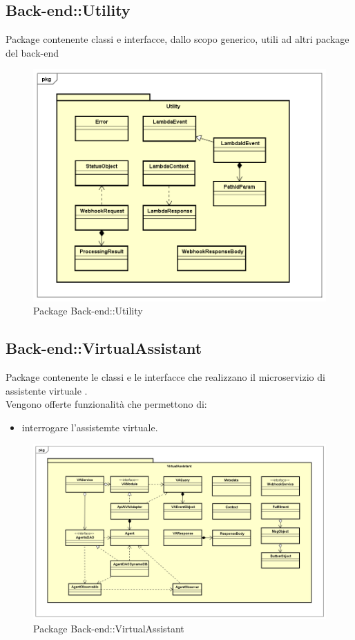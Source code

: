 \subsection{Back-end::Utility}
Package contenente classi e interfacce, dallo scopo generico, utili ad altri package del back-end
\begin{figure}[h] \centering \includegraphics[width=\textwidth,height=\textheight,keepaspectratio]{images/diagrams/back-end/Official_Backend_0304/Utility.png}
\caption{Package Back-end::Utility}
\end{figure}
\newpage

\subsection{Back-end::VirtualAssistant}
Package contenente le classi e le interfacce che realizzano il microservizio di assistente virtuale .\\ Vengono offerte funzionalità che permettono di: \begin{itemize} \item interrogare l'assistemte virtuale. \end{itemize}
\begin{figure}[h] \centering \includegraphics[width=\textwidth,height=\textheight,keepaspectratio]{images/diagrams/back-end/Official_Backend_0304/VirtualAssistant.png}
\caption{Package Back-end::VirtualAssistant}
\end{figure}
\newpage

